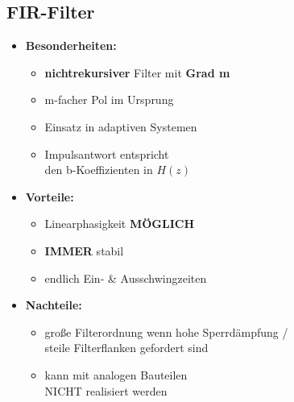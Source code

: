 \documentclass[10pt,a4paper]{article}
\begin{document}
\subsection{FIR-Filter}
\begin{itemize}
  \item \textbf{Besonderheiten: }
       \begin{itemize}
       \item \textbf{nichtrekursiver} Filter mit \textbf{Grad m}
       \item m-facher Pol im Ursprung 
       \item Einsatz in adaptiven Systemen 
       \item Impulsantwort entspricht\\
       den b-Koeffizienten in $H(z)$
       \end{itemize}
  \item \textbf{Vorteile: }
    \begin{itemize}
     \item Linearphasigkeit \textbf{MÖGLICH}
     \item \textbf{IMMER} stabil
     \item endlich Ein- \& Ausschwingzeiten
     \end{itemize}
  \item \textbf{Nachteile: }
    \begin{itemize}
    \item große Filterordnung wenn hohe Sperrdämpfung / \\
    steile Filterflanken gefordert sind
    \item kann mit analogen Bauteilen \\
    NICHT realisiert werden
    \end{itemize}
\end{itemize}
\end{document}
